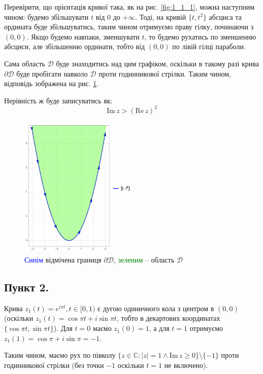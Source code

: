 \documentclass[14pt]{extarticle}
\begin{document}
Перевірити, що орієнтація кривої така, як на рис. \ref{fig:1_1_1}, можна наступним чином: будемо збільшувати $t$ від $0$ до $+\infty$. Тоді, на кривій $\{t,t^2\}$ абсциса та ордината буде збільшуватись, таким чином отримуємо праву гілку, починаючи з $(0,0)$. Якщо будемо навпаки, зменшувати $t$, то будемо рухатись по зменшенню абсциси, але збільшенню ординати, тобто від $(0,0)$ по лівій гілці параболи.

Сама область $\mathcal{D}$ буде знаходитись над цим графіком, оскільки в такому разі крива $\partial\mathcal{D}$ буде пробігати навколо $\mathcal{D}$ проти годинникової стрілки. Таким чином, відповідь зображена на рис. \ref{fig:1_1_2}.

Нерівність ж буде записуватись як:
\[
\text{Im} \, z > (\text{Re} \, z)^2
\]

\begin{figure}[H]
    \centering
    \includegraphics[width=0.5\textwidth]{images/hw_2/hw_2_1_1(2).png}
    \caption{\textcolor{blue}{Синім} відмічена границя $\partial\mathcal{D}$, \textcolor{green}{зеленим} -- область $\mathcal{D}$}
    \label{fig:1_1_2}
\end{figure}

\subsection*{Пункт 2.}

Крива $z_1(t)=e^{i\pi t}, t \in [0,1)$ є дугою одиничного кола з центром в $(0,0)$ (оскільки $z_1(t)=\cos \pi t + i\sin \pi t$, тобто в декартових координатах $\{\cos \pi t, \sin \pi t\}$). Для $t=0$ маємо $z_1(0)=1$, а для $t=1$ отримуємо $z_1(1)=\cos \pi + i \sin \pi = -1$. 

Таким чином, маємо рух по півколу $\{z\in\mathbb{C}:|z|=1 \wedge \text{Im}\, z \geq 0\}\setminus \{-1\}$ проти годинникової стрілки (без точки $-1$ оскільки $t=1$ не включено).
\end{document}
